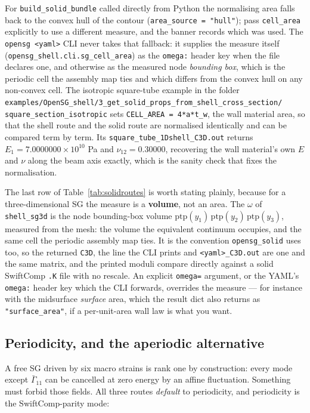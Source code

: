 For \texttt{build\_solid\_bundle} called directly from Python the normalising
area falls back to the convex hull of the contour
(\texttt{area\_source = "hull"}); pass \texttt{cell\_area} explicitly to use a
different measure, and the banner records which was used. The
\texttt{opensg <yaml>} CLI never takes that fallback: it supplies the measure
itself (\texttt{opensg\_shell.cli.sg\_cell\_area}) as the \texttt{omega:} header
key when the file declares one, and otherwise as the measured node
\emph{bounding box}, which is the periodic cell the assembly map ties and which
differs from the convex hull on any non-convex cell.
The isotropic square-tube example in the folder
\texttt{examples/OpenSG\_shell/3\_get\_solid\_props\_from\_shell\_cross\_section/}
\texttt{square\_section\_isotropic}
sets \texttt{CELL\_AREA = 4*a*t\_w}, the wall material area, so that the shell
route and the solid route are normalised identically and can be compared term
by term. Its \texttt{square\_tube\_1Dshell\_C3D.out} returns
$E_1 = 7.0000000\times10^{10}$ Pa and $\nu_{12} = 0.30000$, recovering the wall
material's own $E$ and $\nu$ along the beam axis exactly, which is the sanity
check that fixes the normalisation.

The last row of Table~\ref{tab:solidroutes} is worth stating plainly, because
for a three-dimensional SG the measure is a \textbf{volume}, not an area. The
$\omega$ of \texttt{shell\_sg3d} is the node bounding-box volume
$\mathrm{ptp}(y_1)\,\mathrm{ptp}(y_2)\,\mathrm{ptp}(y_3)$, measured from the
mesh: the volume the equivalent continuum occupies, and the same cell the
periodic assembly map ties. It is the convention \texttt{opensg\_solid} uses
too, so the returned \texttt{C3D}, the line the CLI prints and
\texttt{<yaml>\_C3D.out} are one and the same matrix, and the printed moduli
compare directly against a solid SwiftComp \texttt{.K} file with no rescale.
An explicit \texttt{omega=} argument, or the YAML's \texttt{omega:} header key
which the CLI forwards, overrides the measure --- for instance with the
midsurface \emph{surface} area, which the result dict also returns as
\texttt{"surface\_area"}, if a per-unit-area wall law is what you want.

\subsection{Periodicity, and the aperiodic alternative}
\label{sec:periodicity}

A free SG driven by six macro strains is rank one by construction: every mode
except $\bar\Gamma_{11}$ can be cancelled at zero energy by an affine
fluctuation. Something must forbid those fields. All three routes
\emph{default} to periodicity, and periodicity is the SwiftComp-parity mode:

